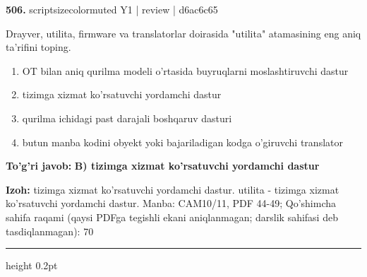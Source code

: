 \documentclass[10pt,a4paper]{article}
\begin{document}
{\bfseries\sffamily\color{ink} 506.} {scriptsizecolor{muted} Y1 | review | d6ac6c65}
\par
Drayver, utilita, firmware va translatorlar doirasida "utilita" atamasining eng aniq ta'rifini toping.
\begin{enumerate}[label=\Alph*),leftmargin=9mm]
\item OT bilan aniq qurilma modeli o'rtasida buyruqlarni moslashtiruvchi dastur
\item tizimga xizmat ko'rsatuvchi yordamchi dastur
\item qurilma ichidagi past darajali boshqaruv dasturi
\item butun manba kodini obyekt yoki bajariladigan kodga o'giruvchi translator
\end{enumerate}
\begin{tcolorbox}[enhanced,breakable,colback=teal!4,colframe=teal!60!black,boxrule=0.45pt,arc=1.2mm,left=2.7mm,right=2.7mm,top=1.8mm,bottom=1.8mm,before skip=2mm,after skip=2mm]
{\bfseries\sffamily\color{teal}To'g'ri javob:} \textbf{B) tizimga xizmat ko'rsatuvchi yordamchi dastur}
\par\smallskip
{\bfseries Izoh:} tizimga xizmat ko'rsatuvchi yordamchi dastur. utilita - tizimga xizmat ko'rsatuvchi yordamchi dastur. Manba: CAM10/11, PDF 44-49; Qo'shimcha sahifa raqami (qaysi PDFga tegishli ekani aniqlanmagan; darslik sahifasi deb tasdiqlanmagan): 70
\end{tcolorbox}
\vspace{2mm}\hrule height 0.2pt\vspace{3mm}
\end{document}
